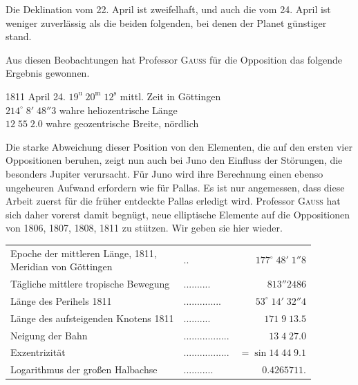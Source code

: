 \par\indent Die Deklination vom 22. April ist zweifelhaft, und auch die vom 24. April ist weniger zuverlässig als die beiden folgenden, bei denen der Planet günstiger stand.

\par\indent Aus diesen Beobachtungen hat Professor \textsc{Gauss} für die Opposition das folgende Ergebnis gewonnen.
\begin{center}1811 April 24. $19^{\text{u}}\;20^{\text{m}}\;12^{\text{s}}$ mittl. Zeit in Göttingen\\$214^\circ\;8'\;48''3$ wahre heliozentrische Länge\\$12\;55\;2.0$ wahre geozentrische Breite, nördlich\end{center}
\par\indent Die starke Abweichung dieser Position von den Elementen, die auf den ersten vier Oppositionen beruhen, zeigt nun auch bei Juno den Einfluss der Störungen, die besonders Jupiter verursacht. Für Juno wird ihre Berechnung einen ebenso ungeheuren Aufwand erfordern wie für Pallas. Es ist nur angemessen, dass diese Arbeit zuerst für die früher entdeckte Pallas erledigt wird. Professor \textsc{Gauss} hat sich daher vorerst damit begnügt, neue elliptische Elemente auf die Oppositionen von 1806, 1807, 1808, 1811 zu stützen. Wir geben sie hier wieder.

\begin{center}\fontsize{10}{12}\selectfont\setlength{\tabcolsep}{4pt}\renewcommand{\arraystretch}{1.15}\begin{tabular}{llr}
\shortstack[l]{Epoche der mittleren Länge, 1811,\\Meridian von Göttingen} & .\;. & $177^\circ\;48'\;1''8$\\
Tägliche mittlere tropische Bewegung & .\;.\;.\;.\;.\;.\;.\;.\;.\;. & $813''2486$\\
Länge des Perihels 1811 & .\;.\;.\;.\;.\;.\;.\;.\;.\;.\;.\;.\;.\;. & $53^\circ\;14'\;32''4$\\
Länge des aufsteigenden Knotens 1811 & .\;.\;.\;.\;.\;.\;.\;.\;.\;. & $171\;9\;13.5$\\
Neigung der Bahn & .\;.\;.\;.\;.\;.\;.\;.\;.\;.\;.\;.\;.\;.\;.\;.\;. & $13\;4\;27.0$\\
Exzentrizität & .\;.\;.\;.\;.\;.\;.\;.\;.\;.\;.\;.\;.\;.\;.\;.\;. & $=\sin14\;44\;9.1$\\
Logarithmus der großen Halbachse & .\;.\;.\;.\;.\;.\;.\;.\;.\;.\;. & $0.4265711.$\\
\end{tabular}\end{center}
